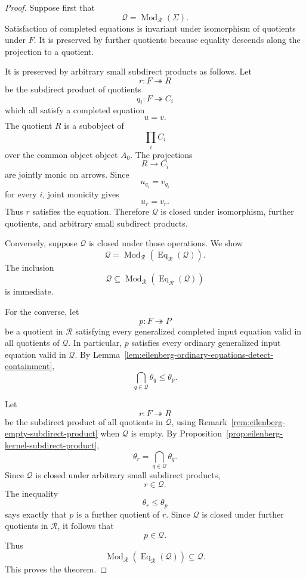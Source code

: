 \begin{proof}
Suppose first that
\[
\mathcal Q=\operatorname{Mod}_{\mathcal R}(\Sigma).
\]
Satisfaction of completed equations is invariant under isomorphism of
quotients under \(F\). It is preserved by further quotients because equality
descends along the projection to a quotient.

It is preserved by arbitrary small subdirect products as follows. Let
\[
r:F\twoheadrightarrow R
\]
be the subdirect product of quotients
\[
q_i:F\twoheadrightarrow C_i
\]
which all satisfy a completed equation
\[
u=v.
\]
The quotient \(R\) is a subobject of
\[
\prod_i C_i
\]
over the common object object \(A_0\). The projections
\[
R\to C_i
\]
are jointly monic on arrows. Since
\[
u_{q_i}=v_{q_i}
\]
for every \(i\), joint monicity gives
\[
u_r=v_r.
\]
Thus \(r\) satisfies the equation. Therefore \(\mathcal Q\) is closed under
isomorphism, further quotients, and arbitrary small subdirect products.

Conversely, suppose \(\mathcal Q\) is closed under those operations. We show
\[
\mathcal Q
=
\operatorname{Mod}_{\mathcal R}
(\operatorname{Eq}_{\mathcal R}(\mathcal Q)).
\]
The inclusion
\[
\mathcal Q
\subseteq
\operatorname{Mod}_{\mathcal R}
(\operatorname{Eq}_{\mathcal R}(\mathcal Q))
\]
is immediate.

For the converse, let
\[
p:F\twoheadrightarrow P
\]
be a quotient in \(\mathcal R\) satisfying every generalized completed input
equation valid in all quotients of \(\mathcal Q\). In particular, \(p\)
satisfies every ordinary generalized input equation valid in \(\mathcal Q\).
By Lemma~\ref{lem:eilenberg-ordinary-equations-detect-containment},
\[
\bigcap_{q\in\mathcal Q}\theta_q
\leq
\theta_p.
\]

Let
\[
r:F\twoheadrightarrow R
\]
be the subdirect product of all quotients in \(\mathcal Q\), using
Remark~\ref{rem:eilenberg-empty-subdirect-product} when \(\mathcal Q\) is
empty. By Proposition~\ref{prop:eilenberg-kernel-subdirect-product},
\[
\theta_r
=
\bigcap_{q\in\mathcal Q}\theta_q.
\]
Since \(\mathcal Q\) is closed under arbitrary small subdirect products,
\[
r\in\mathcal Q.
\]
The inequality
\[
\theta_r\leq\theta_p
\]
says exactly that \(p\) is a further quotient of \(r\). Since \(\mathcal Q\)
is closed under further quotients in \(\mathcal R\), it follows that
\[
p\in\mathcal Q.
\]
Thus
\[
\operatorname{Mod}_{\mathcal R}
(\operatorname{Eq}_{\mathcal R}(\mathcal Q))
\subseteq
\mathcal Q.
\]
This proves the theorem.
\end{proof}

